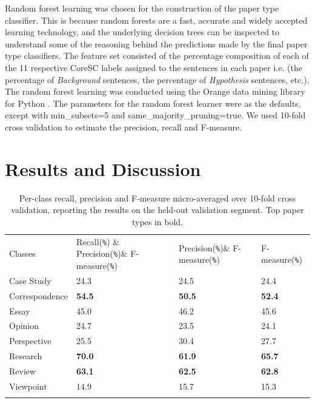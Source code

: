 \documentclass{svmult}
\begin{document}

Random forest learning\cite{Breiman2001} was chosen for the construction of the
paper type classifier. This is because random forests are a fast, accurate and
widely accepted learning technology, and the underlying decision trees can be
inspected to understand some of the reasoning behind the predictions made by
the final paper type classifiers. The feature set consisted of the percentage
composition of each of the 11 respective CoreSC labels assigned to the
sentences in each paper i.e. (the percentage of {\em Background} sentences, the
percentage of {\em Hypothesis} sentences, etc.). The random forest learning was
conducted using the Orange data mining library for Python \cite{Curk2005}.  The
parameters for the random forest learner were as the defaults, except with
min\_subsets=5 and same\_majority\_pruning=true.  We used 10-fold cross
validation to estimate the precision, recall and F-measure.


\vspace{-15pt}
\section{Results and Discussion}
\label{sec:3}



\begin{table}

\caption{Per-class recall, precision and F-measure micro-averaged over 10-fold cross validation, reporting the results on the held-out validation segment. Top paper types in bold.}

\begin{tabular}{p{2.4cm}p{2.0cm}p{2.0cm}p{2.5cm}}
\hline\noalign{\smallskip}
Classes & Recall(\verb|%|) & Precision(\verb|%|)& F-measure(\verb|%|) \\
\noalign{\smallskip}\svhline\noalign{\smallskip}
Case Study      &   24.3    &    24.5     &   24.4 \\
Correspondence  &   {\bf  54.5}    &    {\bf 50.5}    &    {\bf 52.4} \\ 
Essay           &   45.0     &   46.2    &    45.6 \\
Opinion         &   24.7    &    23.5  &      24.1 \\   
Perspective     &   25.5  &      30.4  &       27.7 \\
Research        &   {\bf 70.0}    &    {\bf 61.9}    &    {\bf 65.7} \\
Review          &  {\bf 63.1}     &   {\bf 62.5}     &   {\bf 62.8} \\
Viewpoint       &     14.9     &   15.7  &      15.3 \\
\noalign{\smallskip}\hline\noalign{\smallskip}
\end{tabular}


\vspace{-20pt}
\label{tab:recallPrecision}       %
\end{table}
\end{document}
